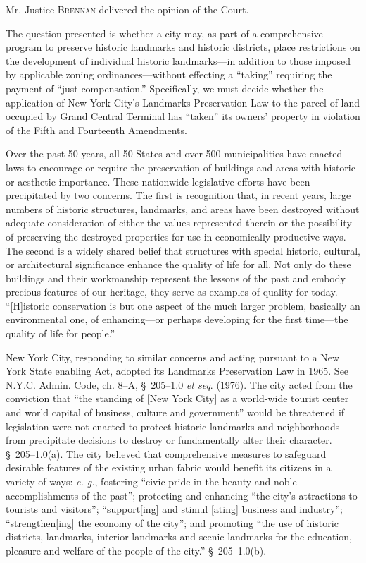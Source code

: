 

\opinion Mr. Justice \textsc{Brennan} delivered the opinion of the Court.

The question presented is whether a city may, as part of a comprehensive program
to preserve historic landmarks and historic districts, place restrictions on the
development of individual historic landmarks---in addition to those imposed by
applicable zoning ordinances---without effecting a ``taking'' requiring the
payment of ``just compensation.'' Specifically, we must decide whether the
application of New York City's Landmarks Preservation Law to the parcel of land
occupied by Grand Central Terminal has ``taken'' its owners' property in
violation of the Fifth and Fourteenth Amendments.





Over the past 50 years, all 50 States and over 500 municipalities have enacted
laws to encourage or require the preservation of buildings and areas with
historic or aesthetic importance. These nationwide legislative efforts have been
precipitated by two concerns. The first is recognition that, in recent years,
large numbers of historic structures, landmarks, and areas have been destroyed
without adequate consideration of either the values represented therein or the
possibility of preserving the destroyed properties for use in economically
productive ways. The second is a widely shared belief that structures with
special historic, cultural, or architectural significance enhance the quality of
life for all. Not only do these buildings and their workmanship represent the
lessons of the past and embody precious features of our heritage, they serve as
examples of quality for today. ``[H]istoric conservation is but one aspect of
the much larger problem, basically an environmental one, of enhancing---or
perhaps developing for the first time---the quality of life for people.''

New York City, responding to similar concerns and acting pursuant to a New York
State enabling Act, adopted its Landmarks Preservation Law in 1965. See N.Y.C.
Admin. Code, ch. 8--A, \S~205--1.0 \textit{et seq}. (1976). The city acted from
the conviction that ``the standing of [New York City] as a world-wide tourist
center and world capital of business, culture and government'' would be
threatened if legislation were not enacted to protect historic landmarks and
neighborhoods from precipitate decisions to destroy or fundamentally alter their
character. \S~205--1.0(a). The city believed that comprehensive measures to
safeguard desirable features of the existing urban fabric would benefit its
citizens in a variety of ways: \textit{e. g.}, fostering ``civic pride in the
beauty and noble accomplishments of the past''; protecting and enhancing ``the
city's attractions to tourists and visitors''; ``support[ing] and stimul [ating]
business and industry''; ``strengthen[ing] the economy of the city''; and
promoting ``the use of historic districts, landmarks, interior landmarks and
scenic landmarks for the education, pleasure and welfare of the people of the
city.'' \S~205--1.0(b).

